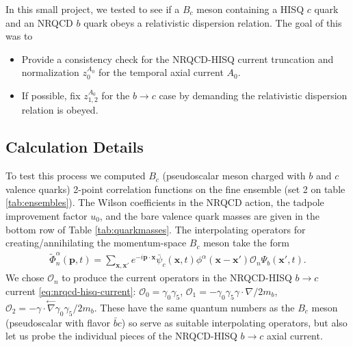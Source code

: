 In this small project, we tested to see if a $B_c$ meson containing a HISQ $c$ quark and an NRQCD $b$ quark obeys a relativistic dispersion relation. The goal of this was to
\begin{itemize}
\item
  Provide a consistency check for the NRQCD-HISQ current truncation and normalization $z_0^{A_0}$ for the temporal axial current $A_0$.
\item
  If possible, fix $z^{A_0}_{1,2}$ for the $b\to c$ case by demanding the relativistic dispersion relation is obeyed.
\end{itemize}

\subsection{Calculation Details}

To test this process we computed $B_c$ (pseudoscalar meson charged with $b$ and $c$ valence quarks) 2-point correlation functions on the fine ensemble (set 2 on table \ref{tab:ensembles}). The Wilson coefficients in the NRQCD action, the tadpole improvement factor $u_0$, and the bare valence quark masses are given in the bottom row of Table \ref{tab:quarkmasses}. The interpolating operators for creating/annihilating the momentum-space $B_c$ meson take the form
\begin{align}
  \tilde{\Phi}_n^{\alpha}(\textbf{p},t) = \sum_{\textbf{x},\textbf{x}'} e^{-i\textbf{p}\cdot\textbf{x}} \bar{\psi}_c(\textbf{x},t) \phi^{\alpha}(\textbf{x}-\textbf{x}')\mathcal{O}_n \Psi_b(\textbf{x}',t).
\end{align}
We chose $\mathcal{O}_n$ to produce the current operators in the NRQCD-HISQ $b\to c$ current \eqref{eq:nrqcd-hisq-current}: $\mathcal{O}_0 = \gamma_0\gamma_5$, $\mathcal{O}_1 = -\gamma_0\gamma_5 \gamma\cdot \nabla /2m_b$, $\mathcal{O}_2 = - \gamma\cdot \stackrel{\leftarrow}{\nabla} \gamma_0\gamma_5  /2m_b$. These have the same quantum numbers as the $B_c$ meson (pseudoscalar with flavor $\bar{b}c$) so serve as suitable interpolating operators, but also let us probe the individual pieces of the NRQCD-HISQ $b\to c$ axial current.

